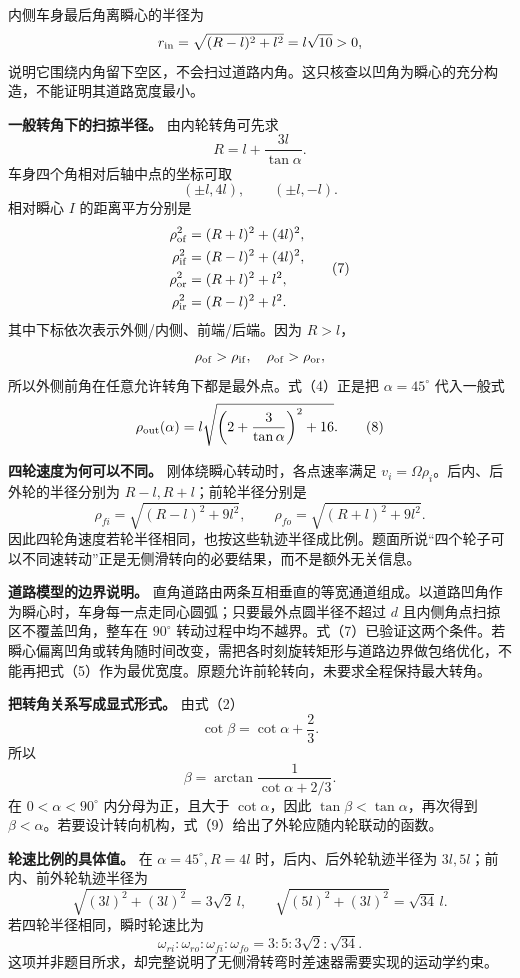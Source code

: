 \documentclass[12pt,a4paper,UTF8]{ctexart}
\begin{document}
内侧车身最后角离瞬心的半径为 \[
r_{\rm in}=\sqrt{(R-l)^2+l^2}=l\sqrt{10}>0,
\]
说明它围绕内角留下空区，不会扫过道路内角。这只核查以凹角为瞬心的充分构造，不能证明其道路宽度最小。

\textbf{一般转角下的扫掠半径。} 由内轮转角可先求 \[
R=l+\frac{3l}{\tan\alpha}. \tag{6}
\] 车身四个角相对后轴中点的坐标可取 \[
(\pm l,4l),\qquad(\pm l,-l).
\] 相对瞬心 \(I\) 的距离平方分别是 \[
\begin{aligned}
\rho_{\rm of}^2&=(R+l)^2+(4l)^2,\\
\rho_{\rm if}^2&=(R-l)^2+(4l)^2,\\
\rho_{\rm or}^2&=(R+l)^2+l^2,\\
\rho_{\rm ir}^2&=(R-l)^2+l^2.
\end{aligned} \tag{7}
\] 其中下标依次表示外侧/内侧、前端/后端。因为 \(R>l\)， \[
\rho_{\rm of}>\rho_{\rm if},\quad
\rho_{\rm of}>\rho_{\rm or},
\] 所以外侧前角在任意允许转角下都是最外点。式（4）正是把
\(\alpha=45^\circ\) 代入一般式 \[
\rho_{\rm out}(\alpha)
=l\sqrt{
\left(2+\frac{3}{\tan\alpha}\right)^2+16
}. \tag{8}
\]

\textbf{四轮速度为何可以不同。} 刚体绕瞬心转动时，各点速率满足
\(v_i=\Omega\rho_i\)。后内、后外轮的半径分别为
\(R-l,R+l\)；前轮半径分别是 \[
\rho_{fi}=\sqrt{(R-l)^2+9l^2},\qquad
\rho_{fo}=\sqrt{(R+l)^2+9l^2}.
\]
因此四轮角速度若轮半径相同，也按这些轨迹半径成比例。题面所说``四个轮子可以不同速转动''正是无侧滑转向的必要结果，而不是额外无关信息。

\textbf{道路模型的边界说明。}
直角道路由两条互相垂直的等宽通道组成。以道路凹角作为瞬心时，车身每一点走同心圆弧；只要最外点圆半径不超过
\(d\) 且内侧角点扫掠区不覆盖凹角，整车在 \(90^\circ\)
转动过程中均不越界。式（7）已验证这两个条件。若瞬心偏离凹角或转角随时间改变，需把各时刻旋转矩形与道路边界做包络优化，不能再把式（5）作为最优宽度。原题允许前轮转向，未要求全程保持最大转角。

\textbf{把转角关系写成显式形式。} 由式（2） \[
\cot\beta=\cot\alpha+\frac23.
\] 所以 \[
\boxed{
\beta=\arctan\frac{1}
{\cot\alpha+2/3}
}. \tag{9}
\] 在 \(0<\alpha<90^\circ\) 内分母为正，且大于 \(\cot\alpha\)，因此
\(\tan\beta<\tan\alpha\)，再次得到
\(\beta<\alpha\)。若要设计转向机构，式（9）给出了外轮应随内轮联动的函数。

\textbf{轮速比例的具体值。} 在 \(\alpha=45^\circ,R=4l\)
时，后内、后外轮轨迹半径为 \(3l,5l\)；前内、前外轮轨迹半径为 \[
\sqrt{(3l)^2+(3l)^2}=3\sqrt2\,l,
\qquad
\sqrt{(5l)^2+(3l)^2}=\sqrt{34}\,l.
\] 若四轮半径相同，瞬时轮速比为 \[
\omega_{ri}:\omega_{ro}:\omega_{fi}:\omega_{fo}
=3:5:3\sqrt2:\sqrt{34}.
\]
这项并非题目所求，却完整说明了无侧滑转弯时差速器需要实现的运动学约束。
\end{document}
